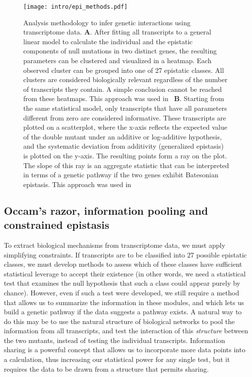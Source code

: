 \begin{figure*}
  \centering{}
  \texttt{[image: intro/epi\_methods.pdf]}
  \caption{Analysis methodology to infer genetic interactions using
  transcriptome data.
  \textbf{A}. After fitting all transcripts to a general linear model to
  calculate the individual and the epistatic components of null mutations in two
  distinct genes, the resulting parameters can be clustered and visualized in a
  heatmap. Each observed cluster can be grouped into one of 27 epistatic
  classes. All clusters are considered biologically relevant regardless of the
  number of transcripts they contain. A simple conclusion cannot be reached
  from these heatmaps. This approach was used in~\citet{Dixit2016,Adamson2016}
  \textbf{B}. Starting from the same statistical model, only transcripts that
  have all parameters different from zero are considered informative. These
  transcripts are plotted on a scatterplot, where the x-axis reflects the
  expected value of the double mutant under an additive or log-additive
  hypothesis, and the systematic deviation from additivity
  (generalized epistasis) is plotted on the y-axis. The resulting points form
  a ray on the plot. The slope of this ray is an aggregate statistic that can be
  interpreted in terms of a genetic pathway if the two genes exhibit Batesonian
  epistasis. This approach was used
  in~\citet{Angeles-Albores2017,Angeles-Albores2018}}\label{fig:stat_methods}
\end{figure*}

\subsection*{Occam's razor, information pooling and constrained epistasis}
To extract biological mechanisms from transcriptome data, we must apply
simplifying constraints. If transcripts are to be classified into 27 possible
epistatic classes, we must develop methods to assess which of these classes have
sufficient statistical leverage to accept their existence (in other words, we
need a statistical test that examines the null hypothesis that such a class
could appear purely by chance). However, even if such a test were developed, we
still require a method that allows us to summarize the information in these
modules, and which lets us build a genetic pathway if the data suggests a
pathway exists. A natural way to do this may be to use the natural structure of
biological networks to pool the information from all transcripts, and test the
interaction of this \emph{structure} between the two mutants, instead of testing
the individual transcripts. Information sharing is a powerful concept that
allows us to incorporate more data points into a calculation, thus increasing
our statistical power for any single test, but it requires the data to be drawn
from a structure that permits sharing.

